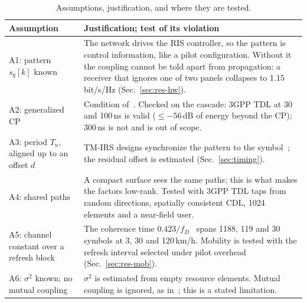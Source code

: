 \documentclass[conference,10pt]{IEEEtran}
\theoremstyle{remark}
\begin{document}
\begin{table}[t]\centering\footnotesize
\caption{Assumptions, justification, and where they are tested.}\label{tab:assump}
\begin{tabular}{@{}p{}p{}@{}}\toprule
Assumption & Justification; test of its violation\\\midrule
A1: pattern $s_q[k]$ known & The network drives the RIS controller, so the pattern is control information, like a pilot configuration. Without it the coupling cannot be told apart from propagation: a receiver that ignores one of two panels collapses to 1.15\,bit/s/Hz (Sec.~\ref{sec:res-hw}).\\
A2: generalized CP & Condition of~\cite{iudice2026}. Checked on the cascade: 3GPP TDL at 30 and 100\,ns is valid ($\le-56$\,dB of energy beyond the CP); 300\,ns is not and is out of scope.\\
A3: period $T_u$, aligned up to an offset $d$ & TM-IRS designs synchronize the pattern to the symbol~\cite{xu2023tmirs}; the residual offset is estimated (Sec.~\ref{sec:timing}).\\
A4: shared paths & A compact surface sees the same paths; this is what makes the factors low-rank. Tested with 3GPP TDL taps from random directions, spatially consistent CDL, 1024 elements and a near-field user.\\
A5: channel constant over a refresh block & The coherence time $0.423/f_D$~\cite{rappaport2002} spans 1188, 119 and 30 symbols at 3, 30 and 120\,km/h. Mobility is tested with the refresh interval selected under pilot overhead (Sec.~\ref{sec:res-mob}).\\
A6: $\sigma^2$ known; no mutual coupling & $\sigma^2$ is estimated from empty resource elements. Mutual coupling is ignored, as in~\cite{iudice2026}; this is a stated limitation.\\\bottomrule
\end{tabular}
\end{table}
\end{document}
